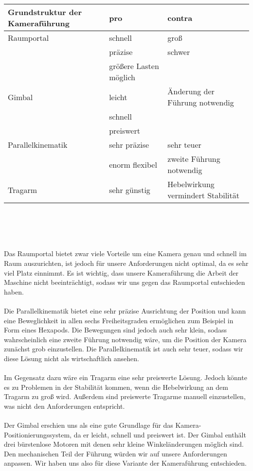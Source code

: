 \documentclass[a4paper]{report}
\begin{document}
\begin{tabular}{lll}
 
Grundstruktur der Kameraführung & pro & contra \\
 \hline
 \hline
Raumportal & schnell & groß \\
 & präzise & schwer \\
& größere Lasten möglich &\\
  \hline
Gimbal & leicht & Änderung der Führung notwendig \\
 & schnell & \\
& preiswert & \\
 \hline
Parallelkinematik & sehr präzise & sehr teuer\\
&  enorm flexibel & zweite Führung notwendig \\
  \hline
Tragarm & sehr günstig  & Hebelwirkung vermindert Stabilität\\

\end{tabular}
\\ \\
\\ \\
Das Raumportal bietet zwar viele Vorteile um eine Kamera genau und schnell im Raum auszurichten, ist jedoch für unsere Anforderungen nicht optimal, da es sehr viel Platz einnimmt. Es ist wichtig, dass unsere Kameraführung die Arbeit der Maschine nicht beeinträchtigt, sodass wir uns gegen das Raumportal entschieden haben. \\ \\
 Die Parallelkinematik bietet eine sehr präzise Ausrichtung der Position und kann eine Beweglichkeit in allen sechs Freiheitsgraden ermöglichen zum Beispiel in Form eines Hexapods. Die Bewegungen sind jedoch auch sehr klein, sodass wahrscheinlich eine zweite Führung notwendig wäre, um die Position der Kamera zunächst grob einzustellen. Die Parallelkinematik ist auch sehr teuer, sodass wir diese Lösung nicht als wirtschaftlich ansehen. \\ \\
Im Gegensatz dazu wäre ein Tragarm eine sehr preiswerte Lösung. Jedoch könnte es zu Problemen in der Stabilität kommen, wenn die Hebelwirkung an dem Tragarm zu groß wird. Außerdem sind preiswerte Tragarme manuell einzustellen, was nicht den Anforderungen entspricht. \\ \\
Der Gimbal erschien uns als eine gute Grundlage für das Kamera-Positionierungssystem, da er leicht, schnell und preiswert ist. Der Gimbal enthält drei bürstenlose Motoren mit denen sehr kleine Winkeländerungen möglich sind. Den mechanischen Teil der Führung würden wir auf unsere Anforderungen anpassen. Wir haben uns also für diese Variante der Kameraführung entschieden. \\ \\
\end{document}
